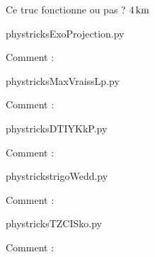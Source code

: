
Ce truc fonctionne ou pas ? $\SI{4}{\kilo\meter}$



    \newcommand{\CaptionFigExoProjection}{<+Type your caption here+>}
    \begin{center}
        
    \end{center}
    phystricksExoProjection.py

    Comment : 

    \clearpage
    


    \newcommand{\CaptionFigMaxVraissLp}{<+Type your caption here+>}
    \begin{center}
        
    \end{center}
    phystricksMaxVraissLp.py

    Comment : 

    \clearpage
    


    \newcommand{\CaptionFigDTIYKkP}{<+Type your caption here+>}
    \begin{center}
        
    \end{center}
    phystricksDTIYKkP.py

    Comment : 

    \clearpage
    


    \newcommand{\CaptionFigtrigoWedd}{<+Type your caption here+>}
    \begin{center}
        
    \end{center}
    phystrickstrigoWedd.py

    Comment : 

    \clearpage
    


    \newcommand{\CaptionFigTZCISko}{<+Type your caption here+>}
    \begin{center}
        
    \end{center}
    phystricksTZCISko.py

    Comment : 

    \clearpage
    


